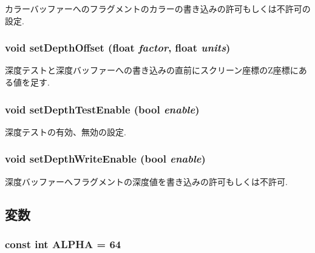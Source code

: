 カラーバッファーへのフラグメントのカラーの書き込みの許可もしくは不許可の設定. \hypertarget{classm3g_1_1CompositingMode_4c825055ad0b5910ef4f9136d9a8e588}{
\subsubsection[{setDepthOffset}]{\setlength{\rightskip}{0pt plus 5cm}void setDepthOffset (float {\em factor}, \/  float {\em units})}}
\label{classm3g_1_1CompositingMode_4c825055ad0b5910ef4f9136d9a8e588}


深度テストと深度バッファーへの書き込みの直前にスクリーン座標のZ座標にある値を足す. \hypertarget{classm3g_1_1CompositingMode_5f1afccdc51665bb04c971579d8ee05c}{
\subsubsection[{setDepthTestEnable}]{\setlength{\rightskip}{0pt plus 5cm}void setDepthTestEnable (bool {\em enable})}}
\label{classm3g_1_1CompositingMode_5f1afccdc51665bb04c971579d8ee05c}


深度テストの有効、無効の設定. \hypertarget{classm3g_1_1CompositingMode_a3275c9589ef319c6ba6f5c22d0b2860}{
\subsubsection[{setDepthWriteEnable}]{\setlength{\rightskip}{0pt plus 5cm}void setDepthWriteEnable (bool {\em enable})}}
\label{classm3g_1_1CompositingMode_a3275c9589ef319c6ba6f5c22d0b2860}


深度バッファーへフラグメントの深度値を書き込みの許可もしくは不許可. 

\subsection{変数}
\hypertarget{classm3g_1_1CompositingMode_417581fcde4067111f47320edb2aa378}{
\subsubsection[{ALPHA}]{\setlength{\rightskip}{0pt plus 5cm}const int {\bf ALPHA} = 64}}
\label{classm3g_1_1CompositingMode_417581fcde4067111f47320edb2aa378}


